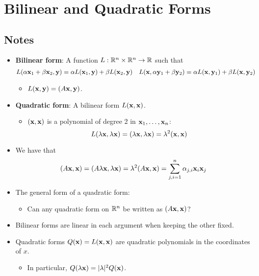 \documentclass[../../notes.tex]{subfiles}
\begin{document}
\chapter{Bilinear and Quadratic Forms}
\section{Notes}
\begin{itemize}
    \item {}\textbf{Bilinear form}: A function $L:\mathbb{R}^n\times\mathbb{R}^n\to\mathbb{R}$ such that
    \begin{align*}
        L(\alpha\mathbf{x}_1+\beta\mathbf{x}_2,\mathbf{y}) &= \alpha L(\mathbf{x}_1,\mathbf{y})+\beta L(\mathbf{x}_2,\mathbf{y})&
        L(\mathbf{x},\alpha\mathbf{y}_1+\beta\mathbf{y}_2) &= \alpha L(\mathbf{x},\mathbf{y}_1)+\beta L(\mathbf{x},\mathbf{y}_2)
    \end{align*}
    \begin{itemize}
        \item $L(\mathbf{x},\mathbf{y})=(A\mathbf{x},\mathbf{y})$.
    \end{itemize}
    \item \textbf{Quadratic form}: A bilinear form $L(\mathbf{x},\mathbf{x})$.
    \begin{itemize}
        \item $(\mathbf{x},\mathbf{x})$ is a polynomial of degree 2 in $\mathbf{x}_1,\dots,\mathbf{x}_n$:
        \begin{equation*}
            L(\lambda\mathbf{x},\lambda\mathbf{x}) = (\lambda\mathbf{x},\lambda\mathbf{x}) = \lambda^2(\mathbf{x},\mathbf{x})
        \end{equation*}
    \end{itemize}
    \item We have that
    \begin{equation*}
        (A\mathbf{x},\mathbf{x}) = (A\lambda\mathbf{x},\lambda\mathbf{x}) = \lambda^2(A\mathbf{x},\mathbf{x}) = \sum_{j,i=1}^n\alpha_{j,i}\mathbf{x}_i\mathbf{x}_j
    \end{equation*}
    \item The general form of a quadratic form:
    \begin{itemize}
        \item Can any quadratic form on $\mathbb{R}^n$ be written as $(A\mathbf{x},\mathbf{x})$?
    \end{itemize}
    \item {}Bilinear forms are linear in each argument when keeping the other fixed.
    \item Quadratic forms $Q(\mathbf{x})=L(\mathbf{x},\mathbf{x})$ are quadratic polynomials in the coordinates of $x$.
    \begin{itemize}
        \item In particular, $Q(\lambda\mathbf{x})=|\lambda|^2Q(\mathbf{x})$.

\end{itemize}
\end{itemize}
\end{document}
